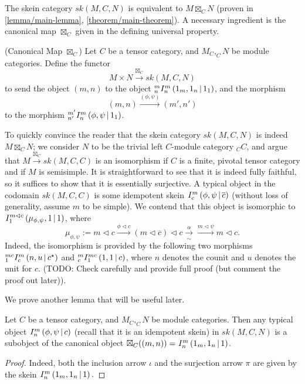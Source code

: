 \noindent The skein category $sk(M,C,N)$ is equivalent to $M \boxtimes_{C} N$ (proven
in \ref{lemma/main-lemma}, \ref{theorem/main-theorem}). A necessary ingredient
is the canonical map $\boxtimes_{C}$ given in the defining universal property.

\begin{definition}\label{definition/canonical-map} (Canonical Map $\boxtimes_{C}$)
  \noindent Let $C$ be a tensor category, and $M_{C}, _{C}N$ be module categories. Define the functor
  \[
    M \times N \xrightarrow{\boxtimes_{C}} sk(M,C,N)
  \]
  to send the object $(m,n)$ to the object ${}^{m}_{n} I^{m}_{n} \left( 1_{m}, 1_{n} \,\middle|\, 1_{1} \right)$, and the morphism
  \[
    (m,n) \xrightarrow{(\phi, \psi)} (m', n')
  \]
  to the morphism ${}^{m'}_{n'} I^{m}_{n} \left( \phi, \psi \,\middle|\, 1_{1} \right)$.
\end{definition}

\noindent To quickly convince the reader that the skein category $sk(M,C,N)$
is indeed $M \boxtimes_{C} N$; we consider $N$ to be the trivial left
$C$-module category $_{C}C$, and argue that
$M \xrightarrow{\boxtimes_{C}} sk(M,C,C)$ is an isomorphism if $C$ is a
finite, pivotal tensor category and if $M$ is semisimple. It is
straightforward to see that it is indeed fully faithful, so it suffices to
show that it is essentially surjective. A typical object in the codomain
$sk(M,C,C)$ is some idempotent skein ${}^{}_{} I^{m}_{c} \left( \phi, \psi \,\middle|\, \overline{c} \right)$
(without loss of generality, assume $m$ to be simple). We contend that this
object is isomorphic to ${}^{}_{} I^{m \lhd c}_{1} \left( \mu_{\phi, \psi}, 1 \,\middle|\, 1 \right)$, where
\[
  \mu_{\phi,\psi} := m \lhd c \xrightarrow{\phi \lhd c} (m \lhd \overline{c}) \lhd c \xrightarrow[\sim]{\alpha} \xrightarrow{m \lhd \psi} m \lhd c.
\]
Indeed, the isomorphism is provided by the following two morphisms
${}^{mc}_{1} I^{m}_{c} \left( n, u \,\middle|\, c^{\star} \right)$ and ${}^{m}_{c} I^{mc}_{1} \left( 1, 1 \,\middle|\, c \right)$, where $n$
denotes the counit and $u$ denotes the unit for $c$. (TODO: Check carefully
and provide full proof (but comment the proof out later)).

\noindent We prove another lemma that will be useful later.

\begin{lemma}\label{lemma/I-provides-subobject}

  \noindent Let $C$ be a tensor category, and $M_{C}, _{C}N$ be module
  categories. Then any typical object ${}^{}_{} I^{m}_{n} \left( \phi, \psi \,\middle|\, c \right)$ (recall
  that it is an idempotent skein) in $sk(M,C,N)$ is a subobject of the
  canonical object $\boxtimes_{C}((m,n)) = {}^{}_{} I^{m}_{n} \left( 1_{m}, 1_{n} \,\middle|\, 1 \right)$.
\end{lemma}
\begin{proof}
  Indeed, both the inclusion arrow $\iota$ and the surjection arrow $\pi$ are
  given by the skein ${}^{}_{} I^{m}_{n} \left( 1_{m}, 1_{n} \,\middle|\, 1 \right).$
\end{proof}

